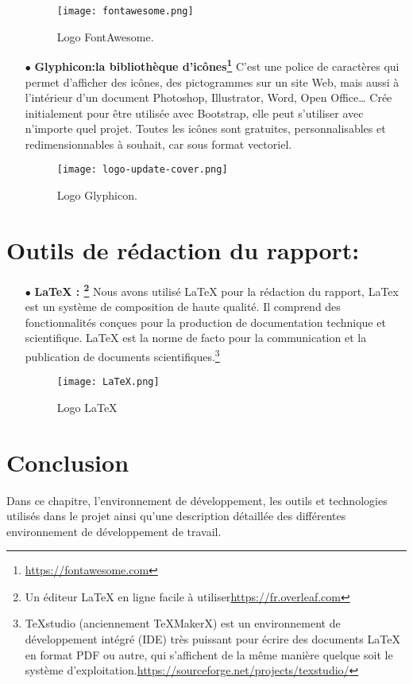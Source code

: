 \begin{itemize}
\begin{figure}[ht]
	\centering
	\texttt{[image: fontawesome.png]}
	\caption{Logo FontAwesome.}
	\label{fig:FontAwesome }
\end{figure}
\FloatBarrier
\medskip
\clearpage
\item[$\bullet$] \textbf{ Glyphicon:la bibliothèque d’icônes\footnote{ \url{https://fontawesome.com} }} 
C’est une police de caractères qui permet d’afficher des icônes, des pictogrammes sur un site Web, mais aussi à l’intérieur d’un document Photoshop, Illustrator, Word, Open Office… Crée initialement pour être utilisée avec Bootstrap, elle peut s’utiliser avec n’importe quel projet. Toutes les icônes sont gratuites, personnalisables et redimensionnables à souhait, car sous format vectoriel.

\begin{figure}[ht]
	\centering
	\texttt{[image: logo-update-cover.png]}
	\caption{Logo Glyphicon.}
	\label{fig:Glyphicon }
\end{figure}
\FloatBarrier
\medskip

\end{itemize}
\section{Outils de rédaction du rapport:}
\begin{itemize}

	\item[$\bullet$] \textbf{ LaTeX : \footnote{ Un éditeur LaTeX en ligne facile à utiliser\url{https://fr.overleaf.com} }} 
Nous avons utilisé LaTeX pour la rédaction du rapport, LaTex est un système de composition
de haute qualité. Il comprend des fonctionnalités conçues pour la production de documentation
technique et scientifique. LaTeX est la norme de facto pour la communication et la publication de
documents scientifiques.\footnote{ TeXstudio (anciennement TeXMakerX) est un environnement de développement intégré (IDE) très puissant pour écrire des documents LaTeX en format PDF ou autre, qui s’affichent de la même manière quelque soit le système d’exploitation.\url{https://sourceforge.net/projects/texstudio/} }\cite{wiki:PHP}
\begin{figure}[ht]
	\centering
	\texttt{[image: LaTeX.png]}
	\caption{Logo LaTeX}
	\label{fig:LaTeX }
\end{figure}
\FloatBarrier
\medskip
\end{itemize}


\section{Conclusion}
Dans ce chapitre, l’environnement de développement, les outils et technologies utilisés dans le projet ainsi qu'une description détaillée des différentes environnement de développement de travail.


